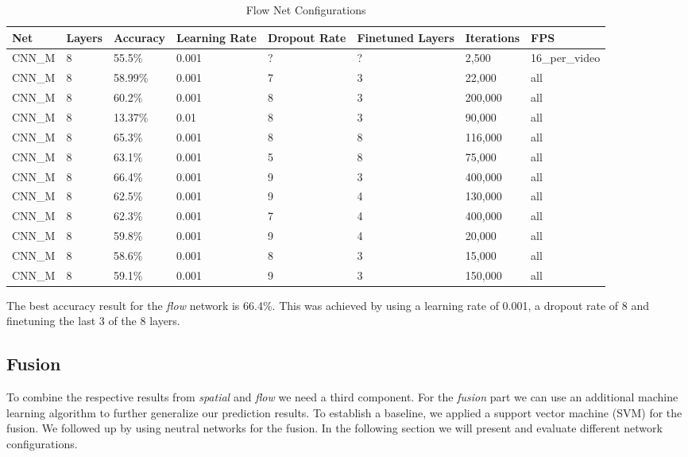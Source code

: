 \begin{table}[H]
\centering
\caption{Flow Net Configurations}
\label{table:flow_results}
\begin{tabularx}{\textwidth}{XXXXXXXX}
\toprule
Net 		& Layers	& Accuracy	& Learning Rate 	& Dropout Rate	& Finetuned Layers	& Iterations	& FPS\\ \midrule

CNN\_M & 8 & 55.5\%   & 0.001 & ? & ? & 2,500   & 16\_per\_video \\
CNN\_M & 8 & 58.99\%  & 0.001 & 7 & 3 & 22,000  & all \\
CNN\_M & 8 & 60.2\%   & 0.001 & 8 & 3 & 200,000 & all \\
CNN\_M & 8 & 13.37\%  &  0.01 & 8 & 3 & 90,000  & all \\
CNN\_M & 8 & 65.3\%   & 0.001 & 8 & 8 & 116,000 & all \\
CNN\_M & 8 & 63.1\%   & 0.001 & 5 & 8 & 75,000  & all \\
CNN\_M & 8 & 66.4\%   & 0.001 & 9 & 3 & 400,000 & all \\
CNN\_M & 8 & 62.5\%   & 0.001 & 9 & 4 & 130,000 & all \\
CNN\_M & 8 & 62.3\%   & 0.001 & 7 & 4 & 400,000 & all \\
CNN\_M & 8 & 59.8\%   & 0.001 & 9 & 4 & 20,000  & all \\
CNN\_M & 8 & 58.6\%   & 0.001 & 8 & 3 & 15,000  & all \\
CNN\_M & 8 & 59.1\%   & 0.001 & 9 & 3 & 150,000 & all \\

\bottomrule
\end{tabularx}
\end{table}

The best accuracy result for the \emph{flow} network is 66.4\%.
This was achieved by using a learning rate of 0.001, a dropout rate of 8 and finetuning the last 3 of the 8 layers.

\subsection{Fusion}
\label{subsec:fusion}

To combine the respective results from \emph{spatial} and \emph{flow} we need a third component.
For the \emph{fusion} part we can use an additional machine learning algorithm to further generalize our prediction results.
To establish a baseline, we applied a support vector machine (SVM) for the fusion.
We followed up by using neutral networks for the fusion.
In the following section we will present and evaluate different network configurations.

